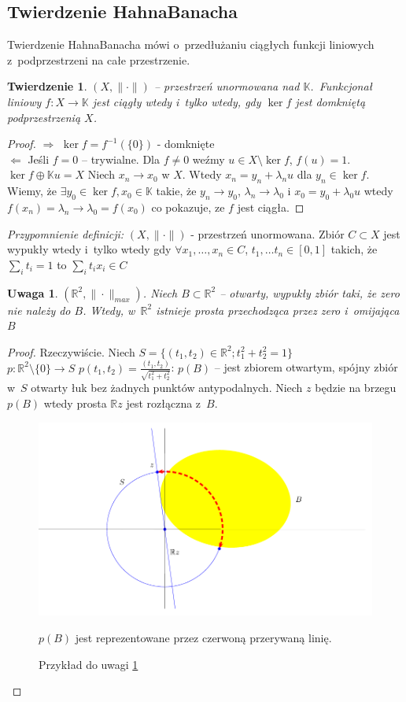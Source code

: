 \documentclass[10pt]{article}
\renewcommand{\[}{\begin{equation}}
\renewcommand{\]}{\end{equation}}
\newcommand{\R}{{\ensuremath{\mathbb R}}}
\newcommand{\K}{\ensuremath{\mathbb{K}}}
\newtheorem{twr}[subsubsection]{Twierdzenie}%
\newtheorem{uw}[subsubsection]{Uwaga}
\begin{document}
\subsection{Twierdzenie Hahna\dywiz Banacha} 
Twierdzenie Hahna\dywiz Banacha mówi o~przedłużaniu ciągłych funkcji liniowych z~podprzestrzeni na całe przestrzenie.
\begin{twr}
	$(X,\|\cdot\|)$ -- przestrzeń unormowana nad \K.~Funkcjonał liniowy $f:X\to\K$ jest ciągły wtedy i~tylko wtedy, gdy
	$\ker f$ jest domkniętą podprzestrzenią $X$.
\end{twr}
\begin{proof}
	$\Rightarrow$ $\ker f = f^{-1}(\{0\})$ - domknięte\\
	$\Leftarrow$ Jeśli $f=0$ -- trywialne. Dla $f \not =0$ weźmy $u\in X \setminus \ker f$, $f(u)=1$. $\ker f \oplus \K u = X$ 
	Niech $x_n \to x_0$ w $X$. Wtedy $x_n =y_n + \lambda_n u$ dla $y_n \in \ker f$.
	Wiemy, że $\exists y_0 \in \ker f, x_0 \in \K$ takie, że $y_n \to y_0$, $\lambda_n \to \lambda_0$ i
	$x_0= y_0 +\lambda_0 u$ wtedy  $f(x_n) = \lambda_n\to \lambda_0 = f(x_0)$ co pokazuje, ze $f$ jest ciągła.
\end{proof}
\textit{Przypomnienie definicji:}
$(X,\|\cdot\|)$ - przestrzeń unormowana. Zbiór  $C\subset X$ jest wypukły  wtedy i~tylko wtedy gdy 
$\forall x_1,\ldots, x_n \in C$, $t_1, \ldots t_n \in [0,1]$ takich, że $\sum_i t_i = 1$ to $\sum_i t_i x_i \in C$
\begin{uw}
  \label{uw1_r}
	$(\R^2,\|\cdot\|_{max})$. Niech $B\subset \R^2$ -- otwarty, wypukły zbiór taki, że zero nie należy do $B$.
	Wtedy, w~$\R^2$ istnieje prosta przechodząca przez zero i~omijająca $B$
\end{uw}
\begin{proof}
	Rzeczywiście. Niech $S= \{ (t_1, t_2) \in \R^2; t_1^2+t_2^2=1\}$ \\
	$p:\R^2\setminus\{0\} \to S$ $p(t_1,t_2) = \frac{(t_1,t_2)}{\sqrt{t_1^2+t_2^2}}$:
	$p(B)$ -- jest zbiorem otwartym, spójny zbiór w~$S$ otwarty łuk bez żadnych punktów antypodalnych.
Niech $z$ będzie na brzegu $p(B)$ wtedy prosta $\R z$ jest rozłączna z~$B$.\\
\begin{figure}[h]
  \centering
  \includegraphics[scale=.7]{rys1}
  \caption{Przykład do uwagi \ref{uw1_r}}
  \scriptsize{ $p(B)$ jest reprezentowane przez czerwoną przerywaną linię.}
\end{figure}
\end{proof}
\end{document}

